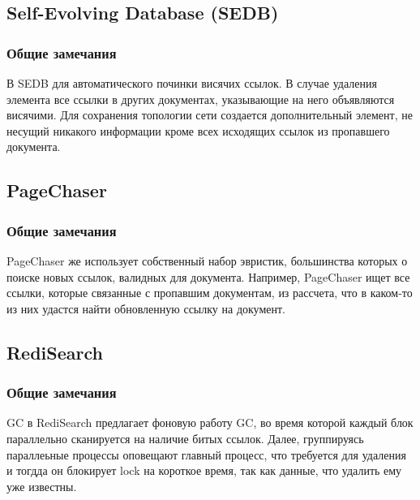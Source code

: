 \subsection{Self-Evolving Database (SEDB)}

\subsubsection{Общие замечания}

В SEDB для автоматического починки висячих ссылок. В случае удаления элемента все ссылки
в других документах, указывающие на него объявляются висячими. Для сохранения топологии
сети создается дополнительный элемент, не несущий никакого информации кроме всех исходящих
ссылок из пропавшего документа.

\subsection{PageChaser}

\subsubsection{Общие замечания}

PageChaser же использует собственный набор эвристик, большинства которых о поиске новых
ссылок, валидных для документа. Например, PageChaser ищет все ссылки, которые
связанные с пропавшим документам, из рассчета, что в каком-то из них удастся найти обновленную ссылку на документ.

\subsection{RediSearch}

\subsubsection{Общие замечания}

GC в RediSearch предлагает фоновую работу GC, во время которой каждый блок параллельно
сканируется на наличие битых ссылок. Далее, группируясь параллеьные процессы оповещают
главный процесс, что требуется для удаления и тогдда он блокирует lock на короткое время,
так как данные, что удалить ему уже известны.